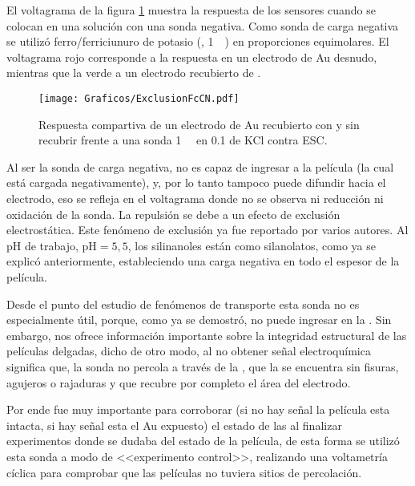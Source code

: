 	El voltagrama de la figura \ref{fig:exclusion_vs_Au} muestra la respuesta de los sensores cuando se colocan en una solución con una sonda negativa. Como sonda de carga negativa se utilizó ferro/ferriciunuro de potasio (\ferroferri, \SI{1}{\milli\Molar}) en proporciones equimolares. El voltagrama rojo corresponde a la respuesta en un electrodo de Au desnudo, mientras que la verde a un electrodo recubierto de \pdm.
	
			\begin{figure}[ht]
				\centering
		 	    \texttt{[image: Graficos/ExclusionFcCN.pdf]}
		        \caption[Exclusión electrostática]{Respuesta compartiva de un electrodo de Au recubierto con \pdmF\space y sin recubrir frente a una sonda \ferroferri \SI{1}{\milli\Molar} en \SI{0.1}{\Molar} de KCl contra ESC.}
		        \label{fig:exclusion_vs_Au}
		      	\end{figure}
	
	 Al ser la sonda de carga negativa, no es capaz de ingresar a la película (la cual está cargada negativamente), y, por lo tanto tampoco puede difundir hacia el electrodo, eso se refleja en el voltagrama donde no se observa ni reducción ni oxidación de la sonda. La repulsión se debe a un efecto de exclusión electrostática. Este fenómeno de exclusión ya fue reportado por varios autores\cite{alberti2015,schmuhl2005,Andrieu-Brunsen2015,brunsen2011}. Al pH de trabajo, $\text{pH}=5,5$, los silinanoles están como silanolatos, como ya se explicó anteriormente, estableciendo una carga negativa en todo el espesor de la película.

	 Desde el punto del estudio de fenómenos de  transporte esta sonda no es especialmente útil, porque, como ya se demostró, no puede ingresar en la \pdm. Sin embargo, nos ofrece información importante sobre la integridad estructural de las películas delgadas, dicho de otro modo, al no obtener señal electroquímica significa que, la sonda no percola a través de la \pdm, que la \pdm\space se encuentra sin fisuras, agujeros o rajaduras y que recubre por completo el área del electrodo.

	 Por ende fue muy importante para corroborar (si no hay señal la película esta intacta, si hay señal esta el Au expuesto) el estado de las \pdm\space al finalizar experimentos donde se dudaba del estado de la película, de esta forma se utilizó esta sonda a modo de <<experimento control>>, realizando una voltametría cíclica para comprobar que las películas no tuviera sitios de percolación.

